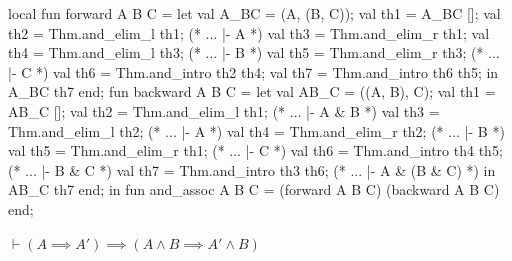 \nwenddocs{}\endmoddef\nwstartdeflinemarkup{}\nwenddeflinemarkup
local
  fun forward A B C =
    let
      val A_BC = (A, (B, C));
      val th1 =  A_BC [];
      val th2 = Thm.and_elim_l th1; (* ... |- A *)
      val th3 = Thm.and_elim_r th1;
      val th4 = Thm.and_elim_l th3; (* ... |- B *)
      val th5 = Thm.and_elim_r th3; (* ... |- C *)
      val th6 = Thm.and_intro th2 th4;
      val th7 = Thm.and_intro th6 th5;
    in
       A_BC th7
    end;
  fun backward A B C =
    let
      val AB_C = ((A, B), C);
      val th1 =  AB_C [];
      val th2 = Thm.and_elim_l th1; (* ... |- A & B *)
      val th3 = Thm.and_elim_l th2; (* ... |- A *)
      val th4 = Thm.and_elim_r th2; (* ... |- B *)
      val th5 = Thm.and_elim_r th1; (* ... |- C *)
      val th6 = Thm.and_intro th4 th5; (* ... |- B & C *)
      val th7 = Thm.and_intro th3 th6; (* ... |- A & (B & C) *)
    in
       AB_C th7
    end;
in
fun and_assoc A B C =
   (forward A B C) (backward A B C)
end;
\eatline
{}\nwendcode{}\nwdocspar
\begin{node}
$\vdash(A\implies A')\implies(A\land B\implies A'\land B)$
\end{node}

